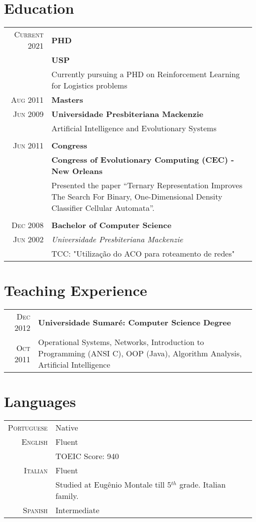 \documentclass[10pt,a4paper]{article}
\newcommand{\br}{\\\multicolumn{2}{c}{}}
\begin{document}
\section{Education}
\begin{tabular}{r|p{16cm}}
	\textsc{Current} 2021 & \textbf{PHD} \\
						& \textbf{USP} \\
						& Currently pursuing a PHD on Reinforcement Learning for Logistics problems \\
	\textsc{Aug} 2011 & \textbf{Masters} \\
	\textsc{Jun} 2009 & \textbf{Universidade Presbiteriana Mackenzie} \\
					  & Artificial Intelligence and Evolutionary Systems \br\\
	\textsc{Jun} 2011 & \textbf{Congress} \\
					  & \textbf{Congress of Evolutionary Computing (CEC) - New Orleans} \\
					  & Presented the paper “Ternary Representation Improves The Search For Binary, One-Dimensional Density Classifier Cellular Automata”. \br\\
    \textsc{Dec} 2008 & \textbf{Bachelor of Computer Science} \\
    \textsc{Jun} 2002 & \textit{Universidade Presbiteriana Mackenzie}  \\
                      & TCC: "Utilização do ACO para roteamento de redes"
\end{tabular}

\section{Teaching Experience}
\begin{tabular}{r|p{16cm}}
	\textsc{Dec} 2012 & \textbf{Universidade Sumaré: Computer Science Degree} \\
	\textsc{Oct} 2011 & Operational Systems, Networks, Introduction to Programming (ANSI C), OOP (Java), Algorithm Analysis, Artificial Intelligence

\end{tabular}

\section{Languages}
\begin{tabular}{r|p{16cm}}
	\textsc{Portuguese} & Native \\
    \textsc{English} & Fluent \\ & TOEIC Score: 940 \\
    \textsc{Italian} & Fluent \\ & Studied at Eugênio Montale till 5$^{th}$ grade. Italian family. \\
    \textsc{Spanish} & Intermediate
\end{tabular}
\end{document}
